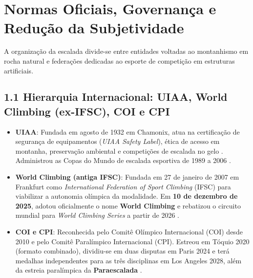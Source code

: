 \section{Normas Oficiais, Governança e Redução da Subjetividade}

A organização da escalada divide-se entre entidades voltadas ao montanhismo em rocha natural e federações dedicadas ao esporte de competição em estruturas artificiais.

\subsection*{1.1 Hierarquia Internacional: UIAA, World Climbing (ex-IFSC), COI e CPI}

\begin{itemize}
    \item \textbf{UIAA}: Fundada em agosto de 1932 em Chamonix, atua na certificação de segurança de equipamentos (\textit{UIAA Safety Label}), ética de acesso em montanha, preservação ambiental e competições de escalada no gelo \cite{uiaa_history}. Administrou as Copas do Mundo de escalada esportiva de 1989 a 2006 \cite{worldclimbing_about}.
    \item \textbf{World Climbing (antiga IFSC)}: Fundada em 27 de janeiro de 2007 em Frankfurt como \textit{International Federation of Sport Climbing} (IFSC) para viabilizar a autonomia olímpica da modalidade. Em \textbf{10 de dezembro de 2025}, adotou oficialmente o nome \textbf{World Climbing} e rebatizou o circuito mundial para \textit{World Climbing Series} a partir de 2026 \cite{worldclimbing_about, worldclimbing_rebrand}.
    \item \textbf{COI e CPI}: Reconhecida pelo Comitê Olímpico Internacional (COI) desde 2010 e pelo Comitê Paralímpico Internacional (CPI). Estreou em Tóquio 2020 (formato combinado), dividiu-se em duas disputas em Paris 2024 e terá medalhas independentes para as três disciplinas em Los Angeles 2028, além da estreia paralímpica da \textbf{Paraescalada} \cite{worldclimbing_about}.
\end{itemize}

